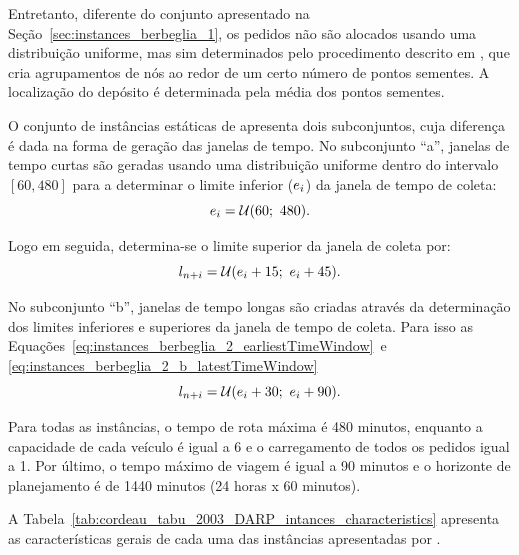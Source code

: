 Entretanto, diferente do conjunto apresentado na 
Seção~\ref{sec:instances_berbeglia_1}, os pedidos não são alocados usando uma
distribuição uniforme, mas sim determinados pelo procedimento descrito em
\textcite{cordeau_tabu_1997}, que cria agrupamentos de nós ao redor de um
certo número de pontos sementes.
A localização do depósito é determinada pela média dos pontos sementes.

O conjunto de instâncias estáticas de \textcite{cordeau_tabu_2003} apresenta
dois subconjuntos, cuja diferença é dada na forma de geração das janelas de
tempo.
No subconjunto ``a'', janelas de tempo curtas são geradas usando uma
distribuição uniforme dentro do intervalo $[60, 480]$ para a determinar o 
limite inferior ($e_i$) da janela de tempo de 
coleta:
%
\begin{equation}
  e_i = \mathcal{U}(60;\ 480).
  \label{eq:instances_berbeglia_2_earliestTimeWindow}
\end{equation}

\noindent Logo em seguida, determina-se o limite superior da janela de coleta 
por:
%
\begin{equation}
  l_{n + i}  = \mathcal{U}(e_i + 15;\ e_i + 45).
  \label{eq:instances_berbeglia_2_a_latestTimeWindow}
\end{equation}

\noindent No subconjunto ``b'', janelas de tempo longas são criadas através da
determinação dos limites inferiores e superiores da janela de tempo de coleta.
Para isso as Equações~\ref{eq:instances_berbeglia_2_earliestTimeWindow}~e
\ref{eq:instances_berbeglia_2_b_latestTimeWindow}
%
\begin{equation}
  l_{n + i} = 
  \mathcal{U}(e_i + 30;\ e_i + 90).
  \label{eq:instances_berbeglia_2_b_latestTimeWindow}
\end{equation}

\noindent Para todas as instâncias, o tempo de rota máxima é 480 minutos, enquanto a
capacidade de cada veículo é igual a 6 e o carregamento de todos os pedidos
igual a 1.
Por último, o tempo máximo de viagem é igual a 90 minutos e o horizonte de
planejamento é de 1440 minutos (24 horas x 60 minutos).

A Tabela~\ref{tab:cordeau_tabu_2003_DARP_intances_characteristics} apresenta as
características gerais de cada uma das instâncias apresentadas por
\textcite{cordeau_tabu_2003}.


